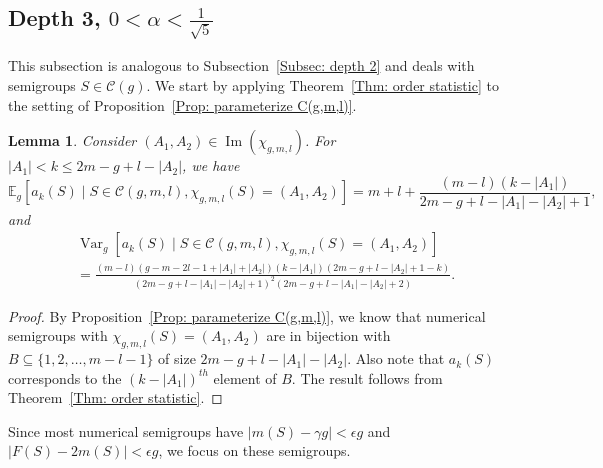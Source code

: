 \documentclass[12pt]{amsart}
\def\E{{\mathbb E}}
\newcommand{\cC}{\mathcal{C}}
\def\Ima{{\operatorname{Im}}}
\def\Var{{\operatorname{Var}}}
\newtheorem{lemma}[theorem]{Lemma}
\begin{document}
\subsection{Depth 3, $0<\alpha<\frac{1}{\sqrt{5}}$}

This subsection is analogous to Subsection~\ref{Subsec: depth 2} and deals with semigroups $S \in \cC(g)$. We start by applying Theorem~\ref{Thm: order statistic} to the setting of Proposition~\ref{Prop: parameterize C(g,m,l)}.  

\begin{lemma}\label{Lem: aks depth 3}
Consider $(A_1,A_2)\in \Ima(\chi_{g,m,l})$. For $|A_1|<k\leq 2m-g+l-|A_2|$, we have
\[
\E_g[a_{k}(S)\mid S\in \cC(g,m,l), \chi_{g,m,l}(S)=(A_1,A_2)] =m+l+\frac{(m-l)(k-|A_1|)}{2m-g+l-|A_1|-|A_2|+1},
\]
and 
\begin{align*}
&\Var_g[a_{k}(S)\mid S\in \cC(g,m,l), \chi_{g,m,l}(S)=(A_1,A_2)] \\
&=\frac{(m-l)(g-m-2l-1+|A_1|+|A_2|) (k-|A_1|) (2m-g+l-|A_2|+1-k)}{(2m-g+l-|A_1|-|A_2|+1)^2 (2m-g+l-|A_1|-|A_2|+2)}.  
\end{align*}
\end{lemma}
\begin{proof}
By Proposition~\ref{Prop: parameterize C(g,m,l)}, we know that numerical semigroups with $\chi_{g,m,l}(S) = (A_1,A_2)$ are in bijection with  $B\subseteq \{1,2,\dots,m-l-1\}$ of size $2m-g+l-|A_1|-|A_2|$. Also note that $a_k(S)$ corresponds to the $(k-|A_1|)^{th}$ element of $B$. The result follows from Theorem~\ref{Thm: order statistic}.
\end{proof}

Since most numerical semigroups have $|m(S)-\gamma g|<\epsilon g $ and $|F(S)-2m(S)|<\epsilon g $, we focus on these semigroups.
\end{document}
